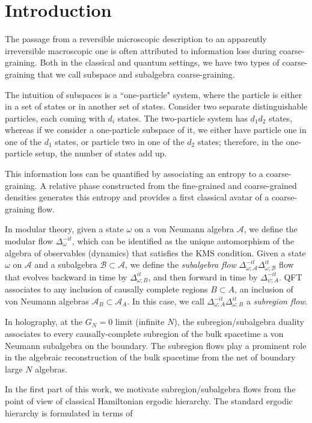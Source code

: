 \documentclass[a4paper,11pt]{article}
\theoremstyle{definition}
\theoremstyle{remark}
\newcommand{\mA}{\mathcal{A}}
\begin{document}
\section{Introduction}


The passage from a reversible microscopic description to an apparently irreversible macroscopic one is often attributed to information loss during coarse-graining. Both in the classical and quantum settings, we have two types of coarse-graining that we call subspace and subalgebra coarse-graining.


The intuition of subspaces is a ``one-particle" system, where the particle is either in a set of states or in another set of states. Consider two separate distinguishable particles, each coming with $d_i$ states. The two-particle system has $d_1d_2$ states, whereas if we consider a one-particle subspace of it, we either have particle one in one of the $d_1$ states, or particle two in one of the $d_2$ states; therefore, in the one-particle setup, the number of states add up.

This information loss can be quantified by associating an entropy to a coarse-graining. A relative phase constructed from the fine-grained and coarse-grained densities generates this entropy and provides a first classical avatar of a coarse-graining flow. 


In modular theory, given a state $\omega$ on a von Neumann algebra $\mA$, we define the modular flow $\Delta_\omega^{-it}$, which can be identified as the unique automorphism of the algebra of observables (dynamics) that satisfies the KMS condition. Given a state $\omega$ on $\mA$ and a subalgebra $\mathcal{B}\subset \mA$, we define the {\it subalgebra flow} $\Delta_{\omega;\mA}^{-it}\Delta_{\omega;\mathcal{B}}^{it}$ flow that evolves backward in time by $\Delta_{\omega;B}^{it}$, and then forward in time by $\Delta_{\psi;A}^{-it}$. QFT associates to any inclusion of causally complete regions $B\subset A$, an inclusion of von Neumann algebras $\mA_B\subset \mA_A$. In this case, we call $\Delta_{\omega;A}^{-it}\Delta_{\omega;B}^{it}$ a {\it subregion flow}.

In holography, at the $G_N=0$ limit (infinite $N$), the subregion/subalgebra duality associates to every causally-complete subregion of the bulk spacetime a von Neumann subalgebra on the boundary. The subregion flows play a prominent role in the algebraic reconstruction of the bulk spacetime from the net of boundary large $N$ algebras. 

In the first part of this work, we motivate subregion/subalgebra flows from the point of view of classical Hamiltonian ergodic hierarchy. The standard ergodic hierarchy is formulated in terms of 
\end{document}
